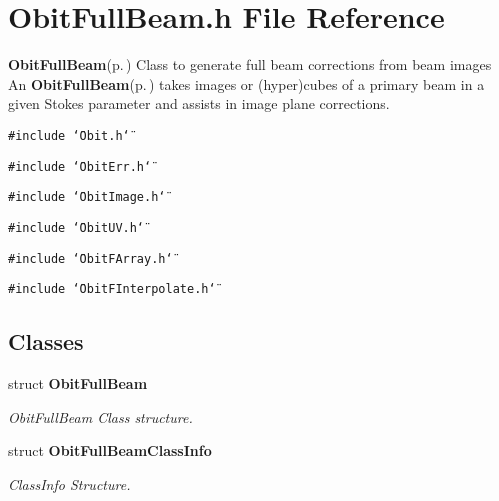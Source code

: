 \section{Obit\-Full\-Beam.h File Reference}
\label{ObitFullBeam_8h}
{\bf Obit\-Full\-Beam}{\rm (p.\,\pageref{structObitFullBeam})} Class to generate full beam corrections from beam images An {\bf Obit\-Full\-Beam}{\rm (p.\,\pageref{structObitFullBeam})} takes images or (hyper)cubes of a primary beam in a given Stokes parameter and assists in image plane corrections. 

{\tt \#include \char`\"{}Obit.h\char`\"{}}\par
{\tt \#include \char`\"{}Obit\-Err.h\char`\"{}}\par
{\tt \#include \char`\"{}Obit\-Image.h\char`\"{}}\par
{\tt \#include \char`\"{}Obit\-UV.h\char`\"{}}\par
{\tt \#include \char`\"{}Obit\-FArray.h\char`\"{}}\par
{\tt \#include \char`\"{}Obit\-FInterpolate.h\char`\"{}}\par
\subsection*{Classes}
\begin{CompactItemize}
\item 
struct {\bf Obit\-Full\-Beam}
\begin{CompactList}\small\item\em Obit\-Full\-Beam Class structure. \item\end{CompactList}\item 
struct {\bf Obit\-Full\-Beam\-Class\-Info}
\begin{CompactList}\small\item\em Class\-Info Structure. \item\end{CompactList}\end{CompactItemize}
